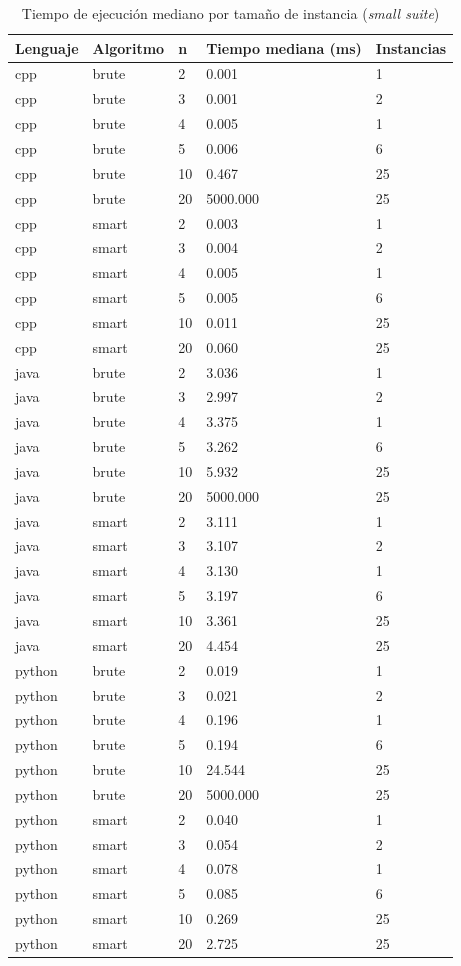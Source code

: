 \begin{table}[htbp]
\centering
\caption{Tiempo de ejecuci\'on mediano por tama\~no de instancia (\textit{small suite})}
\label{tab:summary_by_n}
\begin{tabular}{lllll}
\toprule
Lenguaje & Algoritmo & n & Tiempo mediana (ms) & Instancias \\
\midrule
cpp & brute & 2 & 0.001 & 1 \\
cpp & brute & 3 & 0.001 & 2 \\
cpp & brute & 4 & 0.005 & 1 \\
cpp & brute & 5 & 0.006 & 6 \\
cpp & brute & 10 & 0.467 & 25 \\
cpp & brute & 20 & 5000.000 & 25 \\
cpp & smart & 2 & 0.003 & 1 \\
cpp & smart & 3 & 0.004 & 2 \\
cpp & smart & 4 & 0.005 & 1 \\
cpp & smart & 5 & 0.005 & 6 \\
cpp & smart & 10 & 0.011 & 25 \\
cpp & smart & 20 & 0.060 & 25 \\
java & brute & 2 & 3.036 & 1 \\
java & brute & 3 & 2.997 & 2 \\
java & brute & 4 & 3.375 & 1 \\
java & brute & 5 & 3.262 & 6 \\
java & brute & 10 & 5.932 & 25 \\
java & brute & 20 & 5000.000 & 25 \\
java & smart & 2 & 3.111 & 1 \\
java & smart & 3 & 3.107 & 2 \\
java & smart & 4 & 3.130 & 1 \\
java & smart & 5 & 3.197 & 6 \\
java & smart & 10 & 3.361 & 25 \\
java & smart & 20 & 4.454 & 25 \\
python & brute & 2 & 0.019 & 1 \\
python & brute & 3 & 0.021 & 2 \\
python & brute & 4 & 0.196 & 1 \\
python & brute & 5 & 0.194 & 6 \\
python & brute & 10 & 24.544 & 25 \\
python & brute & 20 & 5000.000 & 25 \\
python & smart & 2 & 0.040 & 1 \\
python & smart & 3 & 0.054 & 2 \\
python & smart & 4 & 0.078 & 1 \\
python & smart & 5 & 0.085 & 6 \\
python & smart & 10 & 0.269 & 25 \\
python & smart & 20 & 2.725 & 25 \\
\bottomrule
\end{tabular}
\end{table}
